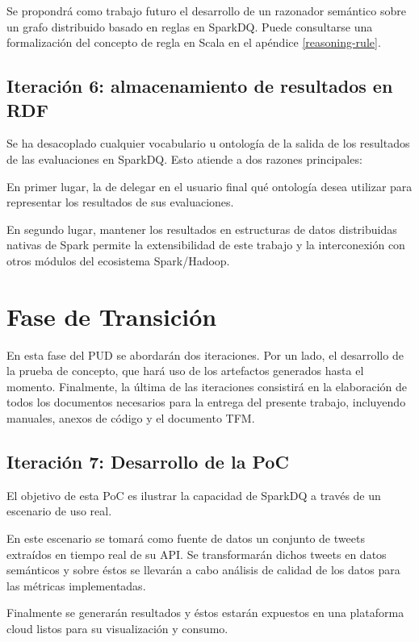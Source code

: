 Se propondrá como trabajo futuro el desarrollo de un razonador semántico sobre
un grafo distribuido basado en reglas en SparkDQ. Puede consultarse una
formalización del concepto de regla en Scala en el apéndice
\ref{reasoning-rule}. 

\subsection{Iteración 6: almacenamiento de resultados en \acs{RDF}}
\label{onto-results}
Se ha desacoplado cualquier vocabulario u ontología de la salida de los
resultados de las evaluaciones en SparkDQ. Esto atiende a dos razones principales: 

En primer lugar, la de delegar en el usuario final qué ontología desea utilizar para representar
los resultados de sus evaluaciones.

En segundo lugar, mantener los resultados en estructuras de datos distribuidas nativas de
Spark permite la extensibilidad de este trabajo y la interconexión con otros
módulos del ecosistema Spark/Hadoop. 


\section{Fase de Transición}

En esta fase del \acs{PUD} se abordarán dos iteraciones. Por un lado, el
desarrollo de la prueba de concepto, que hará uso de los artefactos generados
hasta el momento. Finalmente, la última de las iteraciones consistirá en la
elaboración de todos los documentos necesarios para la entrega del presente
trabajo, incluyendo manuales, anexos de código y el documento \acs{TFM}. 

\subsection{Iteración 7: Desarrollo de la \acs{PoC}}
\label{iteracion7}


El objetivo de esta \acs{PoC} es ilustrar la capacidad de SparkDQ a través de un
escenario de uso real. 

En este escenario se tomará como fuente de datos un
conjunto de tweets extraídos en tiempo real de su API. Se transformarán dichos
tweets en datos semánticos y sobre éstos se llevarán a cabo análisis de calidad
de los datos para las métricas implementadas. 

Finalmente se generarán resultados y éstos estarán expuestos en una plataforma
cloud listos para su visualización y consumo. 


